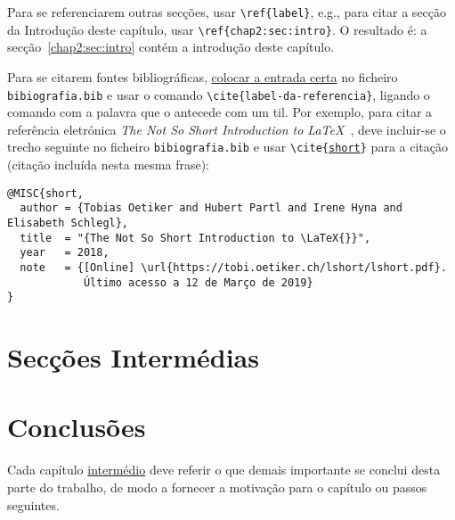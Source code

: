 Para se referenciarem outras secções, usar \texttt{\textbackslash{}ref\{label\}}, e.g., para citar a secção da Introdução deste capítulo, usar \texttt{\textbackslash{}ref\{chap2:sec:intro\}}. O resultado é: a secção~\ref{chap2:sec:intro} contém a introdução deste capítulo.

Para se citarem fontes bibliográficas, \underline{colocar a entrada certa} no ficheiro \texttt{bibiografia.bib} e usar o comando \texttt{\textbackslash{}cite\{label-da-referencia\}}, ligando o comando com a palavra que o antecede com um til. Por exemplo, para citar a referência eletrónica \emph{The Not So Short Introduction to \LaTeX{}}~\cite{short}, deve incluir-se o trecho seguinte no ficheiro \texttt{bibiografia.bib} e usar \texttt{\textbackslash{}cite\{\underline{short}\}} para a citação (citação incluída nesta mesma frase):
%
\begin{verbatim}
@MISC{short,
  author = {Tobias Oetiker and Hubert Partl and Irene Hyna and Elisabeth Schlegl},
  title  = "{The Not So Short Introduction to \LaTeX{}}",
  year   = 2018,
  note   = {[Online] \url{https://tobi.oetiker.ch/lshort/lshort.pdf}. 
            Último acesso a 12 de Março de 2019}
}
\end{verbatim}


\section{Secções Intermédias}
\label{chap2:sec:...}

\section{Conclusões}
\label{chap2:sec:concs}

Cada capítulo \underline{intermédio} deve referir o que demais importante se conclui desta parte do trabalho, de modo a fornecer a motivação para o capítulo ou passos seguintes.